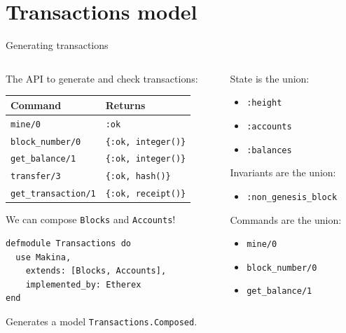 \documentclass[aspectratio=169, 10pt]{beamer}
\begin{document}
\section{Transactions model}
\label{sec:org320b11f}

\begin{frame}[label={sec:org8f813f3},fragile]{Generating transactions}
 \begin{columns}
\begin{column}{0.48\columnwidth}
The API to generate and check transactions:

\begin{center}
\begin{tabular}{ll}
Command & Returns\\
\hline
\texttt{mine/0} & \texttt{:ok}\\
\texttt{block\_number/0} & \texttt{\{:ok, integer()\}}\\
\texttt{get\_balance/1} & \texttt{\{:ok, integer()\}}\\
\texttt{transfer/3} & \texttt{\{:ok, hash()\}}\\
\texttt{get\_transaction/1} & \texttt{\{:ok, receipt()\}}\\
\end{tabular}
\end{center}

We can compose \texttt{Blocks} and \texttt{Accounts}!

\lstset{language=elixir,label= ,caption= ,captionpos=b,numbers=none,style=display}
\begin{lstlisting}
defmodule Transactions do
  use Makina,
    extends: [Blocks, Accounts],
    implemented_by: Etherex
end
\end{lstlisting}

Generates a model \texttt{Transactions.Composed}.
\end{column}

\begin{column}{0.48\columnwidth}
State is the union:
\begin{itemize}
\item \texttt{:height}
\item \texttt{:accounts}
\item \texttt{:balances}
\end{itemize}

\vspace{10pt}

Invariants are the union:
\begin{itemize}
\item \texttt{:non\_genesis\_block}
\end{itemize}

\vspace{10pt}

Commands are the union:
\begin{itemize}
\item \texttt{mine/0}
\item \texttt{block\_number/0}
\item \texttt{get\_balance/1}
\end{itemize}
\end{column}
\end{columns}
\end{frame}
\end{document}
